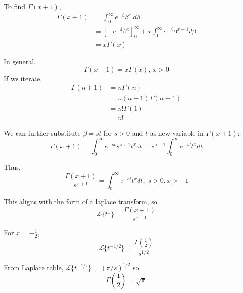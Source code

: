 To find $\Gamma(x+1)$,
\begin{align*}
    \Gamma(x+1)&=\int_0^\infty e^{-\beta}\beta^x\,d\beta\\
    &=\left[-e^{-\beta}\beta^x\right]_0^\infty + x\int_0^\infty e^{-\beta}\beta^{x-1}d\beta\\
    &=x\Gamma(x)
\end{align*}

In general,
\begin{equation}
    \Gamma(x+1)=x\Gamma(x),\,x>0
\end{equation}
If we iterate,
\begin{align*}
    \Gamma(n+1)&=n\Gamma(n)\\
    &=n(n-1)\Gamma(n-1)\\
    &=n!\Gamma(1)\\
    &=n!
\end{align*}

We can further substitute $\beta=st$ for $s>0$ and $t$ as new variable in $\Gamma(x+1)$:
\begin{equation*}
    \Gamma(x+1)=\int_0^\infty e^{-st}s^{x+1}t^xdt=s^{x+1}\int_0^\infty e^{-st}t^xdt
\end{equation*}

Thus,
\begin{equation}
    \frac{\Gamma(x+1)}{s^{x+1}}=\int_0^\infty e^{-st}t^xdt,\;s>0,x>-1
\end{equation}

This aligns with the form of a laplace transform, so
\begin{equation}
    \mathcal{L}\{t^x\}=\frac{\Gamma(x+1)}{s^{x+1}}
\end{equation}

For $x=-\frac{1}{2}$,
\begin{equation*}
    \mathcal{L}\{t^{-1/2}\}=\frac{\Gamma(\frac{1}{2})}{s^{1/2}}
\end{equation*}

From Laplace table, $\mathcal{L}\{t^{-1/2}\}=(\pi/s)^{1/2}$ so
$$ \Gamma\left(\frac{1}{2}\right)=\sqrt{\pi} $$